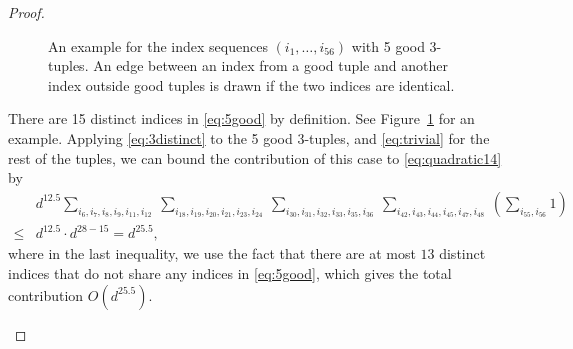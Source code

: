\documentclass[twoside,11pt]{article}
\newcommand{\1}{\mathbf{1}}
\begin{document}
\begin{proof}
\begin{itemize}
\begin{figure}
    \caption{An example for the index sequences $(i_1,\dots,i_{56})$ with 5 good 3-tuples.  An edge between an index from a good tuple and another index outside good tuples is drawn if the two indices are identical.}
    \label{fig:good_3_tuples}
\end{figure}

There are 15 distinct indices in \eqref{eq:5good} by definition. See Figure~\ref{fig:good_3_tuples} for an example. Applying \eqref{eq:3distinct} to the 5 good 3-tuples, and \eqref{eq:trivial} for the rest of the tuples, we can bound the contribution of this case to \eqref{eq:quadratic14} by
\begin{align}
  &d^{12.5}  \sum_{i_6,i_7,i_8,i_9,i_{11},i_{12}} ~\sum_{i_{18},i_{19},i_{20},i_{21},i_{23},i_{24}}~\sum_{i_{30},i_{31},i_{32},i_{33},i_{35},i_{36}} ~\sum_{i_{42},i_{43},i_{44},i_{45},i_{47},i_{48}}~\left(\sum_{i_{55},i_{56}}  1\right)\\
 \leq & d^{12.5} \cdot d^{28-15}=d^{25.5},
\end{align}
where in the last inequality, we use the fact that there are at most $13$ distinct indices that do not share any indices in \eqref{eq:5good}, which gives the total contribution $O(d^{25.5})$. 







\end{itemize}
\end{proof}
\end{document}
